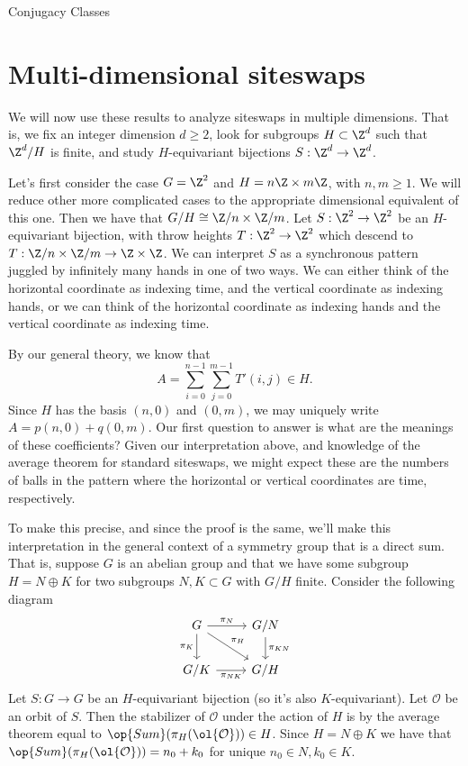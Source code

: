 \documentclass[12nt]{article}
\theoremstyle{plain}
\begin{document}
\begin{subsection}{Conjugacy Classes}
\section{Multi-dimensional siteswaps}

We will now use these results to analyze siteswaps in multiple dimensions. That is, we fix an integer dimension $d \geq 2$, look for subgroups $H \subset \Z^d$ such that $\Z^d/H$ is finite, and study $H$-equivariant bijections $S : \Z^d \to \Z^d$. 

Let's first consider the case $G = \Z^2$ and $H = n\Z \times m\Z$, with $n, m \geq 1$. We will reduce other more complicated cases to the appropriate dimensional equivalent of this one. Then we have that $G/H \cong \Z/n \times \Z/m$. Let $S : \Z^2 \to \Z^2$ be an $H$-equivariant bijection, with throw heights $T : \Z^2 \to \Z^2$ which descend to $T : \Z/n \times \Z/m \to \Z \times \Z$. We can interpret $S$ as a synchronous pattern juggled by infinitely many hands in one of two ways. We can either think of the horizontal coordinate as indexing time, and the vertical coordinate as indexing hands, or we can think of the horizontal coordinate as indexing hands and the vertical coordinate as indexing time.

By our general theory, we know that 
\[
A = \sum \limits_{i = 0}^{n-1} \sum \limits_{j=0}^{m-1} T'(i, j) \in H.
\]
Since $H$ has the basis $(n, 0)$ and  $(0, m)$, we may uniquely write $A = p(n, 0) + q(0, m)$. Our first question to answer is what are the meanings of these coefficients? Given our interpretation above, and knowledge of the average theorem for standard siteswaps, we might expect these are the numbers of balls in the pattern where the horizontal or vertical coordinates are time, respectively. 

To make this precise, and since the proof is the same, we'll make this interpretation in the general context of a symmetry group that is a direct sum. That is, suppose $G$ is an abelian group and that we have some subgroup $H = N \oplus K$ for two subgroups $N, K \subset G$ with $G/H$ finite. Consider the following diagram
\[
\begin{tikzcd}
G\ar[d, "\pi_K"'] \ar[dr, "\pi_H"] \ar[r, "\pi_N"] & G/N \ar[d, "\pi_{KN}"] \\
G/K \ar[r, "\pi_{NK}"'] & G/H
\end{tikzcd}
\]
Let $S : G \to G$ be an $H$-equivariant bijection (so it's also $K$-equivariant). Let $\mathcal{O}$ be an orbit of $S$. Then the stabilizer of $\mathcal{O}$ under the action of $H$ is by the average theorem equal to $\op{Sum}(\pi_H(\ol{\mathcal{O}})) \in H$. Since $H = N \oplus K$ we have that $\op{Sum}(\pi_H(\ol{\mathcal{O}})) = n_0 + k_0$ for unique $n_0 \in N, k_0 \in K$. 



\end{subsection}
\end{document}
